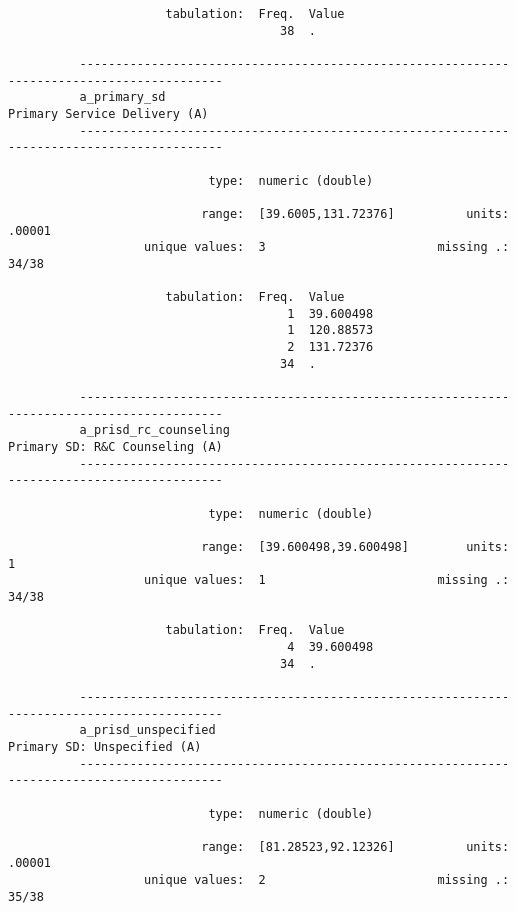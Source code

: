 \documentclass{article}
\begin{document}
\begin{verbatim}
                      tabulation:  Freq.  Value
                                      38  .
          
          ------------------------------------------------------------------------------------------
          a_primary_sd                                                  Primary Service Delivery (A)
          ------------------------------------------------------------------------------------------
          
                            type:  numeric (double)
          
                           range:  [39.6005,131.72376]          units:  .00001
                   unique values:  3                        missing .:  34/38
          
                      tabulation:  Freq.  Value
                                       1  39.600498
                                       1  120.88573
                                       2  131.72376
                                      34  .
          
          ------------------------------------------------------------------------------------------
          a_prisd_rc_counseling                                       Primary SD: R&C Counseling (A)
          ------------------------------------------------------------------------------------------
          
                            type:  numeric (double)
          
                           range:  [39.600498,39.600498]        units:  1
                   unique values:  1                        missing .:  34/38
          
                      tabulation:  Freq.  Value
                                       4  39.600498
                                      34  .
          
          ------------------------------------------------------------------------------------------
          a_prisd_unspecified                                            Primary SD: Unspecified (A)
          ------------------------------------------------------------------------------------------
          
                            type:  numeric (double)
          
                           range:  [81.28523,92.12326]          units:  .00001
                   unique values:  2                        missing .:  35/38
          

\end{verbatim}
\end{document}
